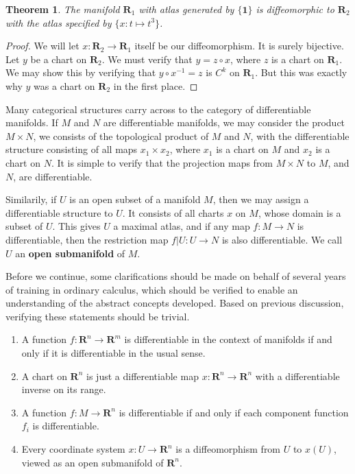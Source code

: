 \documentclass[12pt]{report}
\theoremstyle{plain}
\newtheorem{theorem}{Theorem}[chapter]
\theoremstyle{definition}
\begin{document}
\begin{theorem}
    The manifold $\mathbf{R}_1$ with atlas generated by $\{ \mathbf{1} \}$ is diffeomorphic to $\mathbf{R}_2$ with the atlas specified by $\{ x:t \mapsto t^3 \}$.
\end{theorem}
\begin{proof}
    We will let $x:\mathbf{R}_2 \to \mathbf{R}_1$ itself be our diffeomorphism. It is surely bijective. Let $y$ be a chart on $\mathbf{R}_2$. We must verify that $y = z \circ x$, where $z$ is a chart on $\mathbf{R}_1$. We may show this by verifying that $y \circ x^{-1} = z$ is $C^k$ on $\mathbf{R}_1$. But this was exactly why $y$ was a chart on $\mathbf{R}_2$ in the first place.
\end{proof}

Many categorical structures carry across to the category of differentiable manifolds. If $M$ and $N$ are differentiable manifolds, we may consider the product $M \times N$, we consists of the topological product of $M$ and $N$, with the differentiable structure consisting of all maps $x_1 \times x_2$, where $x_1$ is a chart on $M$ and $x_2$ is a chart on $N$. It is simple to verify that the projection maps from $M \times N$ to $M$, and $N$, are differentiable.

Similarily, if $U$ is an open subset of a manifold $M$, then we may assign a differentiable structure to $U$. It consists of all charts $x$ on $M$, whose domain is a subset of $U$. This gives $U$ a maximal atlas, and if any map $f:M \to N$ is differentiable, then the restriction map $f|U:U \to N$ is also differentiable. We call $U$ an {\bf open submanifold} of $M$.

Before we continue, some clarifications should be made on behalf of several years of training in ordinary calculus, which should be verified to enable an understanding of the abstract concepts developed. Based on previous discussion, verifying these statements should be trivial.

\begin{enumerate}
    \item A function $f: \mathbf{R}^n \to \mathbf{R}^m$ is differentiable in the context of manifolds if and only if it is differentiable in the usual sense.
    \item A chart on $\mathbf{R}^n$ is just a differentiable map $x: \mathbf{R}^n \to \mathbf{R}^n$ with a differentiable inverse on its range.
    \item A function $f: M \to \mathbf{R}^n$ is differentiable if and only if each component function $f_i$ is differentiable.
    \item Every coordinate system $x:U \to \mathbf{R}^n$ is a diffeomorphism from $U$ to $x(U)$, viewed as an open submanifold of $\mathbf{R}^n$.
\end{enumerate}
\end{document}
